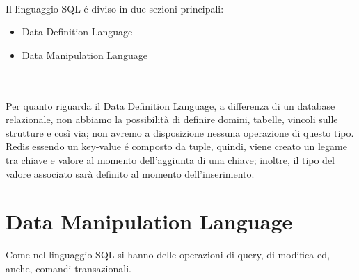 \\
Il linguaggio SQL é diviso in due sezioni principali:
\begin{itemize}
    \item Data Definition Language
    \item Data Manipulation Language
\end{itemize}\\
\\
Per quanto riguarda il Data Definition Language, a differenza di un database relazionale, non abbiamo la possibilità di definire
domini, tabelle, vincoli sulle strutture e così via; non avremo a disposizione nessuna operazione di questo tipo.\\
Redis essendo un key-value é composto da tuple, quindi, viene creato un legame tra chiave e valore al momento dell'aggiunta di una chiave; inoltre, il tipo del valore
associato sarà definito al momento dell'inserimento.
\section{Data Manipulation Language}
Come nel linguaggio SQL si hanno delle operazioni di query, di modifica ed, anche, comandi transazionali.

